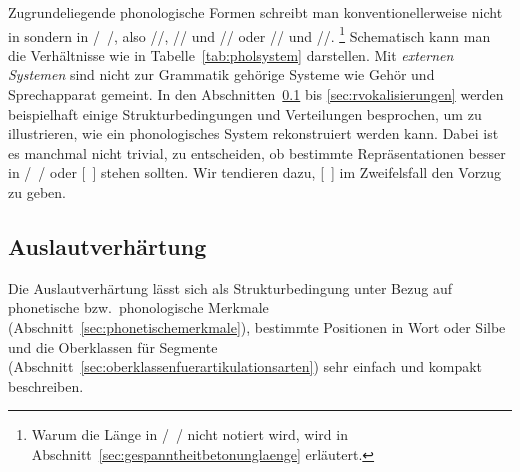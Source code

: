 \begin{table}
  \caption{Lexikon, Phonologie und Phonetik}
  \label{tab:pholsystem}
\end{table}

Zugrundeliegende phonologische Formen schreibt man konventionellerweise nicht in \textipa{[~]} sondern in /~/, also \zB //, // und // oder // und \mbox{//}.%
\footnote{Warum die Länge in /~/ nicht notiert wird, wird in Abschnitt~\ref{sec:gespanntheitbetonunglaenge} erläutert.}
Schematisch kann man die Verhältnisse wie in Tabelle~\ref{tab:pholsystem} darstellen.
Mit \textit{externen Systemen} sind nicht zur Grammatik gehörige Systeme wie Gehör und Sprechapparat gemeint.
In den Abschnitten~\ref{sec:auslautverhaertungphonologie} bis \ref{sec:rvokalisierungen} werden beispielhaft einige Strukturbedingungen und Verteilungen besprochen, um zu illustrieren, wie ein phonologisches System rekonstruiert werden kann.
Dabei ist es manchmal nicht trivial, zu entscheiden, ob bestimmte Repräsentationen besser in /~/ oder [~] stehen sollten.
Wir tendieren dazu, [~] im Zweifelsfall den Vorzug zu geben.

\subsection{Auslautverhärtung}

\label{sec:auslautverhaertungphonologie}

Die Auslautverhärtung lässt sich als Strukturbedingung unter Bezug auf phonetische bzw.\ phonologische Merkmale (Abschnitt~\ref{sec:phonetischemerkmale}), bestimmte Positionen in Wort oder Silbe und die Oberklassen für Segmente (Abschnitt~\ref{sec:oberklassenfuerartikulationsarten}) sehr einfach und kompakt beschreiben.


